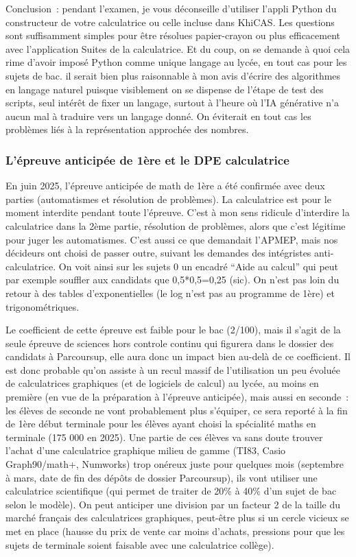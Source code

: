\documentclass{article}
\begin{document}
\begin{giacjshere}
Conclusion~: pendant l'examen, je vous déconseille d'utiliser
l'appli Python du constructeur de votre calculatrice ou celle 
incluse dans KhiCAS. Les questions sont suffisamment simples
pour être résolues papier-crayon ou plus efficacement
avec l'application Suites de la calculatrice.
Et du coup, on se demande à quoi cela rime d'avoir imposé Python
comme unique langage au lycée, en tout cas pour les sujets de bac.
il serait bien plus raisonnable à mon avis d'écrire des algorithmes 
en langage naturel puisque visiblement on se dispense de l'étape de test 
des scripts, seul intérêt de fixer un langage, surtout à l'heure où
l'IA générative n'a aucun mal à traduire vers un langage donné.
On éviterait en tout cas les problèmes
liés à la représentation approchée des nombres.

\subsubsection{L'épreuve anticipée de 1ère et le DPE calculatrice}
En juin 2025, l'épreuve anticipée de math de 1ère a été confirmée
avec deux parties (automatismes et résolution de problèmes).
La calculatrice est pour le moment interdite pendant toute
l'épreuve. C'est à mon sens ridicule d'interdire la calculatrice
dans la 2ème partie, résolution de problèmes, alors que c'est
légitime pour juger les automatismes. C'est aussi ce que
demandait l'APMEP, mais nos décideurs ont choisi de passer outre,
suivant les demandes des intégristes anti-calculatrice.
On voit ainsi sur les sujets 0 un encadré ``Aide au calcul''
qui peut par exemple souffler aux candidats que 0,5*0,5=0,25 (sic). 
On n'est pas loin
du retour à des tables d'exponentielles (le log n'est pas au programme
de 1ère) et trigonométriques.

Le coefficient de cette épreuve est faible pour le bac (2/100), 
mais il s'agit de la seule épreuve de sciences hors controle continu
qui figurera dans le dossier des candidats à Parcoursup, elle aura
donc un impact bien au-delà de ce coefficient. Il est donc
probable qu'on assiste à un recul massif de l'utilisation un peu évoluée
de calculatrices graphiques (et de logiciels de calcul) au lycée, 
au moins en première (en vue de la préparation à l'épreuve
anticipée), mais aussi
en seconde~: les élèves de seconde ne vont probablement plus s'équiper,
ce sera reporté à la fin de 1ère début terminale
pour les élèves ayant choisi la spécialité maths en terminale
(175 000 en 2025). Une partie de ces élèves
va sans doute trouver l'achat
d'une calculatrice graphique milieu de gamme
(TI83, Casio Graph90/math+, Numworks) trop onéreux 
juste pour quelques mois (septembre à
mars, date de fin des dépôts de dossier Parcoursup), ils vont utiliser
une calculatrice scientifique (qui permet de traiter de 20\% à
40\% d'un sujet de bac selon le modèle). 
On peut anticiper une division par un facteur 2
de la taille du marché français des calculatrices graphiques,
peut-être plus si un cercle vicieux se met en place (hausse
du prix de vente car moins d'achats, pressions pour que les sujets de 
terminale soient faisable avec une calculatrice collège). 


\end{giacjshere}
\end{document}

